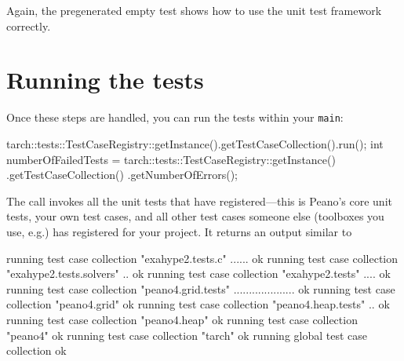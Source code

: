 \noindent
Again, the pregenerated empty test shows how to use the unit test framework
correctly.



\section{Running the tests}
Once these steps are handled, you can run the tests within your \texttt{main}:

\begin{code}
tarch::tests::TestCaseRegistry::getInstance().getTestCaseCollection().run();
int numberOfFailedTests = tarch::tests::TestCaseRegistry::getInstance()
                         .getTestCaseCollection()
                         .getNumberOfErrors();
\end{code}

\noindent
The call invokes all the unit tests that have registered---this is Peano's core
unit tests, your own test cases, and all other test cases someone else
(toolboxes you use, e.g.) has registered for your project.
It returns an output similar to
\begin{code}
running test case collection "exahype2.tests.c" ...... ok                                                                                                                
running test case collection "exahype2.tests.solvers" .. ok                                                                                                              
running test case collection "exahype2.tests" .... ok                                                                                                                    
running test case collection "peano4.grid.tests" .................... ok                                                                                                 
running test case collection "peano4.grid"  ok                                                                                                                           
running test case collection "peano4.heap.tests" .. ok                                                                                                                   
running test case collection "peano4.heap"  ok                                                                                                                           
running test case collection "peano4"  ok                                                                                                                                
running test case collection "tarch"  ok                                                                                                                                
running global test case collection  ok                                                                                                                                 
\end{code}

